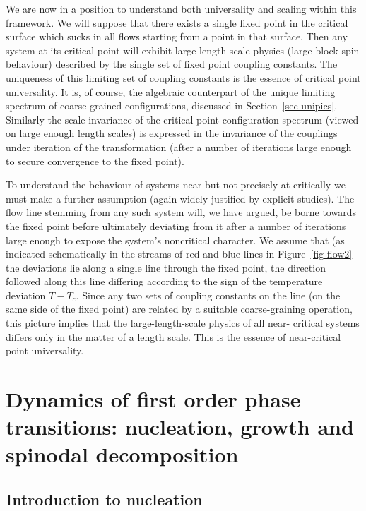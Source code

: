 \documentclass[
  letterpaper,
  enabledeprecatedfontcommands]{report}
\begin{document}
We are now in a position to understand both universality and scaling
within this framework. We will suppose that there exists a single fixed
point in the critical surface which sucks in all flows starting from a
point in that surface. Then any system at its critical point will
exhibit large-length scale physics (large-block spin behaviour)
described by the single set of fixed point coupling constants. The
uniqueness of this limiting set of coupling constants is the essence of
critical point universality. It is, of course, the algebraic counterpart
of the unique limiting spectrum of coarse-grained configurations,
discussed in Section~\ref{sec-unipics}. Similarly the scale-invariance
of the critical point configuration spectrum (viewed on large enough
length scales) is expressed in the invariance of the couplings under
iteration of the transformation (after a number of iterations large
enough to secure convergence to the fixed point).

To understand the behaviour of systems near but not precisely at
critically we must make a further assumption (again widely justified by
explicit studies). The flow line stemming from any such system will, we
have argued, be borne towards the fixed point before ultimately
deviating from it after a number of iterations large enough to expose
the system's noncritical character. We assume that (as indicated
schematically in the streams of red and blue lines in
Figure~\ref{fig-flow2} the deviations lie along a single line through
the fixed point, the direction followed along this line differing
according to the sign of the temperature deviation \(T-T_c\). Since any
two sets of coupling constants on the line (on the same side of the
fixed point) are related by a suitable coarse-graining operation, this
picture implies that the large-length-scale physics of all near-
critical systems differs only in the matter of a length scale. This is
the essence of near-critical point universality.

\chapter{Dynamics of first order phase transitions: nucleation, growth
and spinodal
decomposition}\label{dynamics-of-first-order-phase-transitions-nucleation-growth-and-spinodal-decomposition}

\section{Introduction to nucleation}\label{introduction-to-nucleation}
\end{document}
